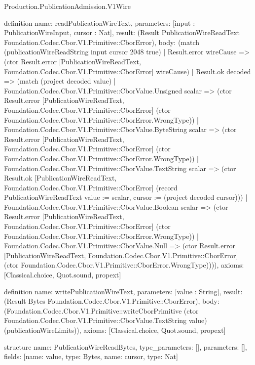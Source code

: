 \begin{lexlean}{Production.PublicationAdmission.V1Wire}
\begin{semanticmodule}
definition{
  name: readPublicationWireText,
  parameters: [input : PublicationWireInput, cursor : Nat],
  result: (Result PublicationWireReadText Foundation.Codec.Cbor.V1.Primitive::CborError),
  body: (match (publicationWireReadString input cursor 2048 true)
    | Result.error wireCause => (ctor Result.error [PublicationWireReadText, Foundation.Codec.Cbor.V1.Primitive::CborError] wireCause)
    | Result.ok decoded => (match (project decoded value)
      | Foundation.Codec.Cbor.V1.Primitive::CborValue.Unsigned scalar => (ctor Result.error [PublicationWireReadText, Foundation.Codec.Cbor.V1.Primitive::CborError] (ctor Foundation.Codec.Cbor.V1.Primitive::CborError.WrongType))
      | Foundation.Codec.Cbor.V1.Primitive::CborValue.ByteString scalar => (ctor Result.error [PublicationWireReadText, Foundation.Codec.Cbor.V1.Primitive::CborError] (ctor Foundation.Codec.Cbor.V1.Primitive::CborError.WrongType))
      | Foundation.Codec.Cbor.V1.Primitive::CborValue.TextString scalar => (ctor Result.ok [PublicationWireReadText, Foundation.Codec.Cbor.V1.Primitive::CborError] (record PublicationWireReadText {value := scalar, cursor := (project decoded cursor)}))
      | Foundation.Codec.Cbor.V1.Primitive::CborValue.Boolean scalar => (ctor Result.error [PublicationWireReadText, Foundation.Codec.Cbor.V1.Primitive::CborError] (ctor Foundation.Codec.Cbor.V1.Primitive::CborError.WrongType))
      | Foundation.Codec.Cbor.V1.Primitive::CborValue.Null => (ctor Result.error [PublicationWireReadText, Foundation.Codec.Cbor.V1.Primitive::CborError] (ctor Foundation.Codec.Cbor.V1.Primitive::CborError.WrongType)))),
  axioms: [Classical.choice, Quot.sound, propext]
}

definition{
  name: writePublicationWireText,
  parameters: [value : String],
  result: (Result Bytes Foundation.Codec.Cbor.V1.Primitive::CborError),
  body: (Foundation.Codec.Cbor.V1.Primitive::writeCborPrimitive (ctor Foundation.Codec.Cbor.V1.Primitive::CborValue.TextString value) (publicationWireLimits)),
  axioms: [Classical.choice, Quot.sound, propext]
}

structure{
  name: PublicationWireReadBytes,
  type_parameters: [],
  parameters: [],
  fields: [{name: value, type: Bytes}, {name: cursor, type: Nat}]
}


\end{semanticmodule}
\end{lexlean}
